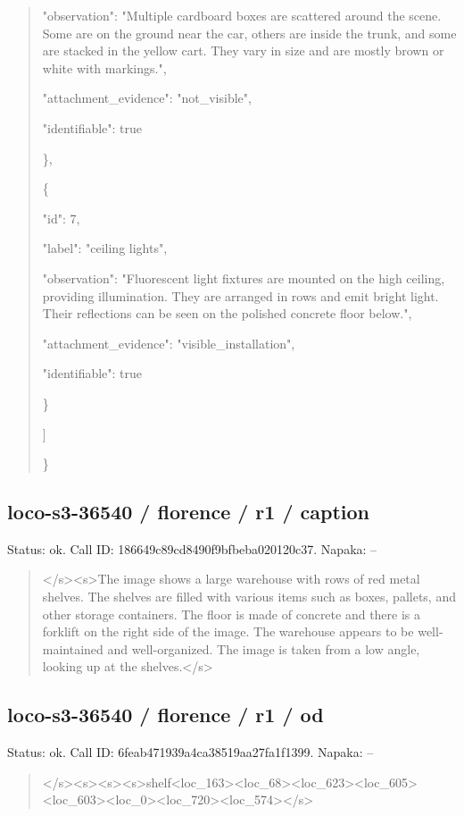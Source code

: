\documentclass[10pt,a4paper]{article}
\begin{document}
\begin{quote}
      "observation":\allowbreak{} "Multiple cardboard boxes are scattered around the scene. Some are on the ground near the car,\allowbreak{} others are inside the trunk,\allowbreak{} and some are stacked in the yellow cart. They vary in size and are mostly brown or white with markings.",\allowbreak{}\par
      "attachment\_evidence":\allowbreak{} "not\_visible",\allowbreak{}\par
      "identifiable":\allowbreak{} true\par
    \},\allowbreak{}\par
    \{\par
      "id":\allowbreak{} 7,\allowbreak{}\par
      "label":\allowbreak{} "ceiling lights",\allowbreak{}\par
      "observation":\allowbreak{} "Fluorescent light fixtures are mounted on the high ceiling,\allowbreak{} providing illumination. They are arranged in rows and emit bright light. Their reflections can be seen on the polished concrete floor below.",\allowbreak{}\par
      "attachment\_evidence":\allowbreak{} "visible\_installation",\allowbreak{}\par
      "identifiable":\allowbreak{} true\par
    \}\par
  ]\par
\}
\end{quote}
\subsection*{loco-s3-36540 / florence / r1 / caption}
Status: ok. Call ID: 186649c89cd8490f9bfbeba020120c37. Napaka: --
\begin{quote}\footnotesize
</s>\allowbreak{}<s>\allowbreak{}The image shows a large warehouse with rows of red metal shelves. The shelves are filled with various items such as boxes,\allowbreak{} pallets,\allowbreak{} and other storage containers. The floor is made of concrete and there is a forklift on the right side of the image. The warehouse appears to be well-maintained and well-organized. The image is taken from a low angle,\allowbreak{} looking up at the shelves.</s>\allowbreak{}
\end{quote}
\subsection*{loco-s3-36540 / florence / r1 / od}
Status: ok. Call ID: 6feab471939a4ca38519aa27fa1f1399. Napaka: --
\begin{quote}\footnotesize
</s>\allowbreak{}<s>\allowbreak{}<s>\allowbreak{}<s>\allowbreak{}shelf<loc\_163>\allowbreak{}<loc\_\allowbreak{}68>\allowbreak{}<loc\_623>\allowbreak{}<loc\_605>\allowbreak{}<loc\_603>\allowbreak{}<l\allowbreak{}oc\_0>\allowbreak{}<loc\_720>\allowbreak{}<loc\_574>\allowbreak{}</s>\allowbreak{}
\end{quote}
\end{document}
